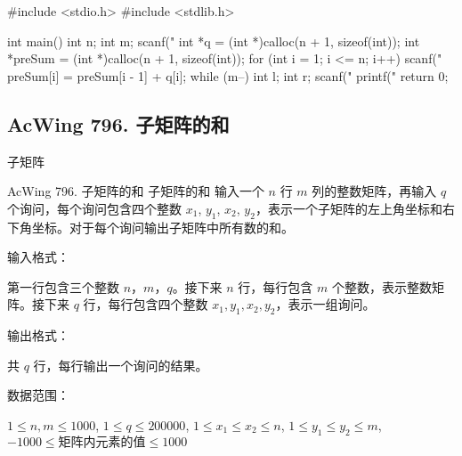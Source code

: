 \begin{mycpponecol}[前缀和]
    #include <stdio.h>
    #include <stdlib.h>

    int main() {
        int n;
        int m;
        scanf("%
        int *q = (int *)calloc(n + 1, sizeof(int));
        int *preSum = (int *)calloc(n + 1, sizeof(int));
        for (int i = 1; i <= n; i++) {
            scanf("%
            preSum[i] = preSum[i - 1] + q[i];
        }
        while (m--) {
            int l;
            int r;
            scanf("%
            printf("%
        }
        return 0;
    }
\end{mycpponecol}

\subsection{AcWing 796. 子矩阵的和}
子矩阵
\begin{problembox}{AcWing 796. 子矩阵的和}
    \small{子矩阵的和}
    输入一个 $n$ 行 $m$ 列的整数矩阵，再输入 $q$ 个询问，每个询问包含四个整数 $x_1$, $y_1$, $x_2$, $y_2$，表示一个子矩阵的左上角坐标和右下角坐标。对于每个询问输出子矩阵中所有数的和。

    输入格式：

    第一行包含三个整数 $n$，$m$，$q$。接下来 $n$ 行，每行包含 $m$ 个整数，表示整数矩阵。接下来 $q$ 行，每行包含四个整数 $x_1, y_1, x_2, y_2$，表示一组询问。

    输出格式：

    共 $q$ 行，每行输出一个询问的结果。

    数据范围：

    $1 \le n,m \le 1000$,
    $1 \le q \le 200000$,
    $1 \le x_1 \le x_2 \le n$,
    $1 \le y_1 \le y_2 \le m$,
    $-1000 \le 矩阵内元素的值 \le 1000$

    \begin{inputblock}
         \\
         \\
         \\
         \\
         \\
        \\
    \end{inputblock}
    \begin{outputblock}
         \\
         \\
    \end{outputblock}
\end{problembox}

